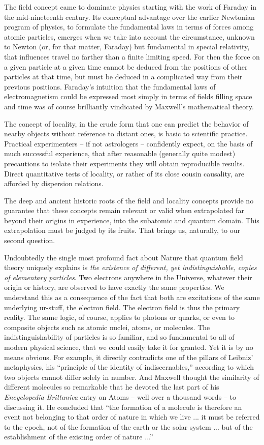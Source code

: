 \documentclass[aps,epsf]{revtex4}
\begin{document}
The field concept came to dominate physics starting with the work of
Faraday in the mid-nineteenth century.  Its conceptual advantage over
the earlier Newtonian program of physics, to formulate the fundamental
laws in terms of forces among atomic particles, emerges when we take
into account the circumstance, unknown to Newton (or, for that matter,
Faraday) but fundamental in special relativity, that influences travel
no farther than a finite limiting speed.  For then the force on a
given particle at a given time cannot be deduced from the positions of
other particles at that time, but must be deduced in a complicated way
from their previous positions.  Faraday's intuition that the
fundamental laws of electromagnetism could be expressed most simply in
terms of fields filling space and time was of course brilliantly
vindicated by Maxwell's mathematical theory.

The concept of locality, in the crude form that one can predict the
behavior of nearby objects without reference to distant ones, is basic
to scientific practice.  Practical experimenters -- if not astrologers
-- confidently expect, on the basis of much successful experience,
that after reasonable (generally quite modest) precautions to isolate
their experiments they will obtain reproducible results.  Direct
quantitative tests of locality, or rather of its close cousin
causality, are afforded by dispersion relations.

The deep and ancient historic roots of the field and locality concepts
provide no guarantee that these concepts remain relevant or valid when
extrapolated far beyond their origins in experience, into the
subatomic and quantum domain.  This extrapolation must be judged by
its fruits.  That brings us, naturally, to our second question.

Undoubtedly the single most profound fact about Nature
that quantum field theory uniquely explains is {\it the existence of
different, yet indistinguishable, copies of elementary particles}.
Two electrons anywhere in the Universe, whatever their origin or
history, are observed to have exactly the same properties.  We
understand this as a consequence of the fact that both are excitations
of the same underlying ur-stuff, the electron field.  The electron
field is thus the primary reality.  The same logic, of course, applies
to photons or quarks, or even to composite objects such as atomic
nuclei, atoms, or molecules.  The indistinguishability of particles is
so familiar, and so fundamental to all of modern physical science,
that we could easily take it for granted.  Yet it is by no means
obvious.  For example, it directly contradicts one of the pillars of
Leibniz' metaphysics, his ``principle of the identity of
indiscernables,'' according to which two objects cannot differ
solely in number.  And Maxwell thought the similarity of different
molecules so remarkable that he devoted the last part of his {\it
Encyclopedia Brittanica\/} entry on Atoms -- well over a thousand
words -- to discussing it.  He concluded that ``the formation of a
molecule is therefore an event not belonging to that order of nature
in which we live ... it must be referred to the epoch, not of the
formation of the earth or the solar system ... but of the
establishment of the existing order of nature ...'' 
\end{document}
